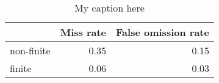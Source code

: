 \begin{table}[!ht]
\centering
\begin{tabular}{lrr}
\toprule
{} &  Miss rate &  False omission rate \\
\midrule
non-finite &       0.35 &                 0.15 \\
finite     &       0.06 &                 0.03 \\
\bottomrule
\end{tabular}
\caption{My caption here}
\label{tab:FINITENESS-ocd-combined-errors}
\end{table}